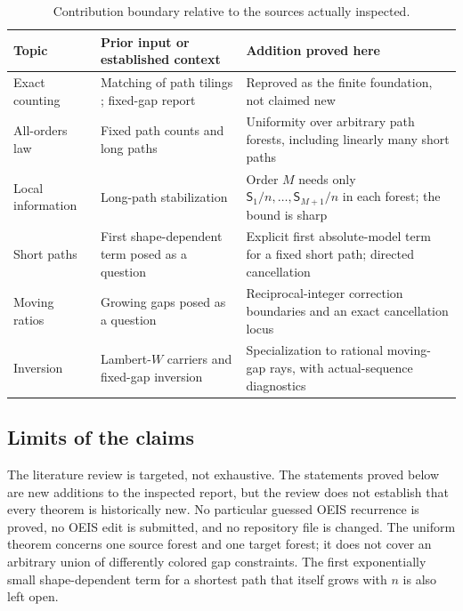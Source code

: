 \documentclass[11pt]{article}
\numberwithin{equation}{section}
\theoremstyle{definition}
\theoremstyle{remark}
\theoremstyle{definition}
\begin{document}
\begin{table}[htbp]
\centering\small
\renewcommand{\arraystretch}{1.18}
\begin{tabular}{@{}>{\raggedright\arraybackslash}p{}>{\raggedright\arraybackslash}p{}>{\raggedright\arraybackslash}p{}@{}}
\toprule
Topic & Prior input or established context & Addition proved here\\
\midrule
Exact counting & Matching of path tilings \cite{spahn}; fixed-gap report \cite{mgProveIt}
& Reproved as the finite foundation, not claimed new\\
All-orders law & Fixed path counts and long paths \cite{mgProveIt}
& Uniformity over arbitrary path forests, including linearly many short paths\\
Local information & Long-path stabilization \cite{mgProveIt}
& Order $M$ needs only $\mathsf S_1/n,\ldots,\mathsf S_{M+1}/n$ in each forest; the bound is sharp\\
Short paths & First shape-dependent term posed as a question \cite{mgProveIt}
& Explicit first absolute-model term for a fixed short path; directed cancellation\\
Moving ratios & Growing gaps posed as a question \cite{mgProveIt}
& Reciprocal-integer correction boundaries and an exact cancellation locus\\
Inversion & Lambert-$W$ carriers and fixed-gap inversion \cite{mgProveIt,dlmfW}
& Specialization to rational moving-gap rays, with actual-sequence diagnostics\\
\bottomrule
\end{tabular}
\caption{Contribution boundary relative to the sources actually inspected.}
\label{spf:mg:tab:boundary}
\end{table}

\subsection{Limits of the claims}

The literature review is targeted, not exhaustive. The statements proved
below are new additions to the inspected report, but the review does not
establish that every theorem is historically new. No particular guessed
OEIS recurrence is proved, no OEIS edit is submitted, and no repository
file is changed. The uniform theorem concerns one source forest and one
target forest; it does not cover an arbitrary union of differently colored
gap constraints. The first exponentially small shape-dependent term for a
shortest path that itself grows with $n$ is also left open.
\end{document}

